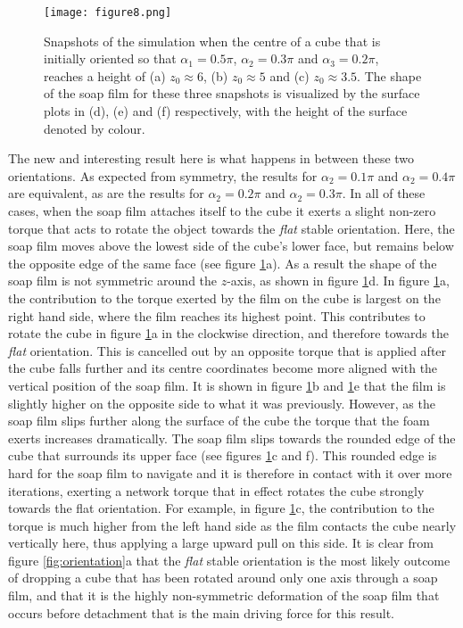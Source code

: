 \documentclass[preprint]{revtex4-1}
\begin{document}
\begin{figure}
\centering
\texttt{[image: figure8.png]}
	\caption{Snapshots of the simulation when the centre of a cube that is initially oriented so that $\alpha_1=0.5\pi$, $\alpha_2=0.3\pi$ and $\alpha_3=0.2\pi$, reaches a height of (a) $z_0\approx 6$, (b) $z_0\approx 5$ and (c) $z_0\approx 3.5$. The shape of the soap film for these three snapshots is visualized by the surface plots in (d), (e) and (f) respectively, with the height of the surface denoted by colour.}
	\label{fig:off_diagonal_sim}
\end{figure}





The new and interesting result here is what happens in between these two orientations. As expected from symmetry, the results for $\alpha_2=0.1\pi$ and $\alpha_2=0.4\pi$ are equivalent, as are the results for $\alpha_2=0.2\pi$ and $\alpha_2=0.3\pi$. In all of these cases, when the soap film attaches itself to the cube it exerts a slight non-zero torque that acts to rotate the object towards the \emph{flat} stable orientation. Here, the soap film moves above the lowest side of the cube's lower face, but remains below the opposite edge of the same face (see figure \ref{fig:off_diagonal_sim}a). As a result the shape of the soap film is not symmetric around the $z$-axis, as shown in figure \ref{fig:off_diagonal_sim}d. In figure \ref{fig:off_diagonal_sim}a, the contribution to the torque exerted by the film on the cube is largest on the right hand side, where the film reaches its highest point. This contributes to rotate the cube in figure \ref{fig:off_diagonal_sim}a in the clockwise direction, and therefore towards the \emph{flat} orientation. 
This is cancelled out by an opposite torque that is applied after the cube falls further and its centre coordinates become more aligned with the vertical position of the soap film. It is shown in figure \ref{fig:off_diagonal_sim}b and \ref{fig:off_diagonal_sim}e that the film is slightly higher on the opposite side to what it was previously. However, as the soap film slips further along the surface of the cube the torque that the foam exerts increases dramatically. The soap film slips towards the rounded edge of the cube that surrounds its upper face (see figures \ref{fig:off_diagonal_sim}c and f). This rounded edge is hard for the soap film to navigate and it is therefore in contact with it over more iterations, exerting a network torque that in effect rotates the cube strongly towards the flat orientation. For example, in figure \ref{fig:off_diagonal_sim}c, the contribution to the torque is much higher from the left hand side as the film contacts the cube nearly vertically here, thus applying a large upward pull on this side. It is clear from figure \ref{fig:orientation}a that the \emph{flat} stable orientation is the most likely outcome of dropping a cube that has been rotated around only one axis through a soap film, and that it is the highly non-symmetric deformation of the soap film that occurs before detachment that is the main driving force for this result.
\end{document}
